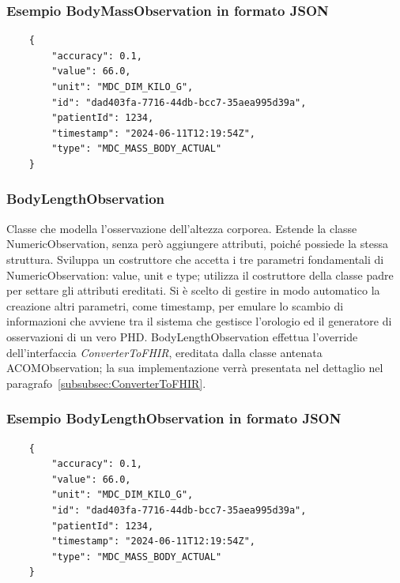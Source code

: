\documentclass[a4paper]{article}
\begin{document}
\subsubsection*{Esempio BodyMassObservation in formato JSON}
\begin{lstlisting}
    {
        "accuracy": 0.1,
        "value": 66.0,
        "unit": "MDC_DIM_KILO_G",
        "id": "dad403fa-7716-44db-bcc7-35aea995d39a",
        "patientId": 1234,
        "timestamp": "2024-06-11T12:19:54Z",
        "type": "MDC_MASS_BODY_ACTUAL"
    }
\end{lstlisting}
\subsubsection*{BodyLengthObservation}
Classe che modella l'osservazione dell'altezza corporea.
Estende la classe NumericObservation, senza però aggiungere attributi, poiché possiede la stessa struttura.
Sviluppa un costruttore che accetta i tre parametri fondamentali di NumericObservation: value, unit e type; utilizza il costruttore della classe padre per settare gli attributi ereditati.
Si è scelto di gestire in modo automatico la creazione altri parametri, come timestamp, per emulare lo scambio di informazioni che avviene tra il sistema che gestisce l'orologio ed il generatore di osservazioni di un vero PHD.
BodyLengthObservation effettua l'override dell'interfaccia \textit{ConverterToFHIR}, ereditata dalla classe antenata ACOMObservation; la sua implementazione verrà presentata nel dettaglio nel paragrafo~\ref{subsubsec:ConverterToFHIR}.
\subsubsection*{Esempio BodyLengthObservation in formato JSON}
\begin{lstlisting}
    {
        "accuracy": 0.1,
        "value": 66.0,
        "unit": "MDC_DIM_KILO_G",
        "id": "dad403fa-7716-44db-bcc7-35aea995d39a",
        "patientId": 1234,
        "timestamp": "2024-06-11T12:19:54Z",
        "type": "MDC_MASS_BODY_ACTUAL"
    }
\end{lstlisting}
\end{document}
